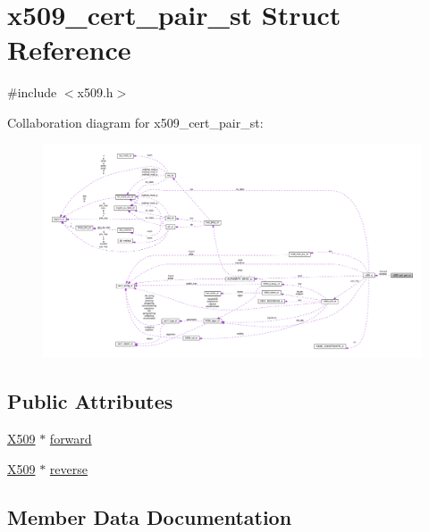 \hypertarget{structx509__cert__pair__st}{}\section{x509\+\_\+cert\+\_\+pair\+\_\+st Struct Reference}
\label{structx509__cert__pair__st}


{\ttfamily \#include $<$x509.\+h$>$}



Collaboration diagram for x509\+\_\+cert\+\_\+pair\+\_\+st\+:
\nopagebreak
\begin{figure}[H]
\begin{center}
\leavevmode
\includegraphics[width=350pt]{structx509__cert__pair__st__coll__graph}
\end{center}
\end{figure}
\subsection*{Public Attributes}
\begin{DoxyCompactItemize}
\item 
\hyperlink{ossl__typ_8h_a4f666bde6518f95deb3050c54b408416}{X509} $\ast$ \hyperlink{structx509__cert__pair__st_a6187bc9b7943e8089be772b2657cfc65}{forward}
\item 
\hyperlink{ossl__typ_8h_a4f666bde6518f95deb3050c54b408416}{X509} $\ast$ \hyperlink{structx509__cert__pair__st_acf854c09163ea3c9a79890aa13dee3bd}{reverse}
\end{DoxyCompactItemize}


\subsection{Member Data Documentation}

